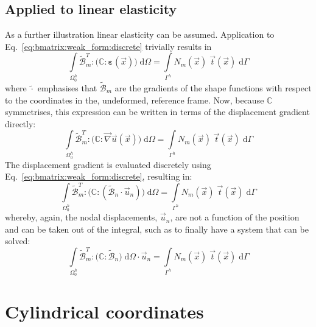 \documentclass[times,namecite]{goose-article}
\begin{document}
\subsection{Applied to linear elasticity}

As a further illustration linear elasticity can be assumed. Application to Eq.~\eqref{eq:bmatrix:weak_form:discrete} trivially results in
\begin{equation}
  \int\limits_{\Omega_0^h}
    \tilde{\mathcal{B}}_m^T : \Big( \mathbb{C} : \bm{\varepsilon}(\vec{x}) \Big) \;
  \mathrm{d}\Omega
  =
  \int\limits_{\Gamma^h}
    N_m(\vec{x}) \; \vec{t}(\vec{x}) \;
  \mathrm{d}\Gamma
\end{equation}
where $\tilde{\cdot}$ emphasises that $\tilde{\mathcal{B}}_m$ are the gradients of the shape functions with respect to the coordinates in the, undeformed, reference frame. Now, because $\mathbb{C}$ symmetrises, this expression can be written in terms of the displacement gradient directly:
\begin{equation}
  \int\limits_{\Omega_0^h}
    \tilde{\mathcal{B}}_m^T : \Big( \mathbb{C} : \vec{\nabla}\vec{u}(\vec{x}) \Big) \;
  \mathrm{d}\Omega
  =
  \int\limits_{\Gamma^h}
    N_m(\vec{x}) \; \vec{t}(\vec{x}) \;
  \mathrm{d}\Gamma
\end{equation}
The displacement gradient is evaluated discretely using Eq.~\eqref{eq:bmatrix:weak_form:discrete}, resulting in:
\begin{equation}
  \int\limits_{\Omega_0^h}
    \tilde{\mathcal{B}}_m^T : \Big( \mathbb{C} : ( \tilde{\mathcal{B}}_n \cdot \vec{u}_n) \Big) \;
  \mathrm{d}\Omega
  =
  \int\limits_{\Gamma^h}
    N_m(\vec{x}) \; \vec{t}(\vec{x}) \;
  \mathrm{d}\Gamma
\end{equation}
whereby, again, the nodal displacements, $\vec{u}_n$, are not a function of the position and can be taken out of the integral, such as to finally have a system that can be solved:
\begin{equation}
  \int\limits_{\Omega_0^h}
    \tilde{\mathcal{B}}_m^T : \Big( \mathbb{C} : \tilde{\mathcal{B}}_n \Big) \;
  \mathrm{d}\Omega
  \cdot \vec{u}_n
  =
  \int\limits_{\Gamma^h}
    N_m(\vec{x}) \; \vec{t}(\vec{x}) \;
  \mathrm{d}\Gamma
\end{equation}

\section{Cylindrical coordinates}
\end{document}
